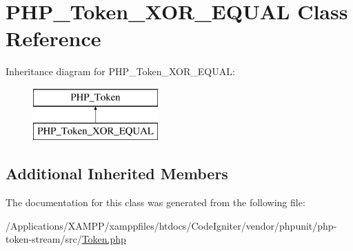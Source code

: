 \hypertarget{class_p_h_p___token___x_o_r___e_q_u_a_l}{}\section{P\+H\+P\+\_\+\+Token\+\_\+\+X\+O\+R\+\_\+\+E\+Q\+U\+AL Class Reference}
\label{class_p_h_p___token___x_o_r___e_q_u_a_l}
Inheritance diagram for P\+H\+P\+\_\+\+Token\+\_\+\+X\+O\+R\+\_\+\+E\+Q\+U\+AL\+:\begin{figure}[H]
\begin{center}
\leavevmode
\includegraphics[height=2.000000cm]{class_p_h_p___token___x_o_r___e_q_u_a_l}
\end{center}
\end{figure}
\subsection*{Additional Inherited Members}


The documentation for this class was generated from the following file\+:\begin{DoxyCompactItemize}
\item 
/\+Applications/\+X\+A\+M\+P\+P/xamppfiles/htdocs/\+Code\+Igniter/vendor/phpunit/php-\/token-\/stream/src/\mbox{\hyperlink{_token_8php}{Token.\+php}}\end{DoxyCompactItemize}
